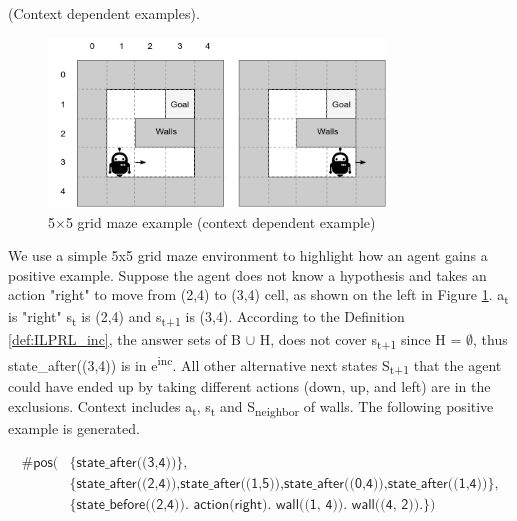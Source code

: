 
\begin{examp} \normalfont (Context dependent examples).

\begin{figure}[!htb]
\centering
\includegraphics[width=0.8\textwidth]{./figures/pipeline_example1}
\caption{5$\times$5 grid maze example (context dependent example)}
\label{example_pos_example}
\end{figure}

We use a simple 5x5 grid maze environment to highlight how an agent gains a positive example.
Suppose the agent does not know a hypothesis and takes an action "right" to move from (2,4) to (3,4) cell, as shown on the left in Figure \ref{example_pos_example}.
a\textsubscript{t} is "right" s\textsubscript{t} is (2,4) and s\textsubscript{t+1} is (3,4).
According to the Definition \ref{def:ILPRL_inc}, the answer sets of B $\cup$ H, does not cover s\textsubscript{t+1} since H = $\emptyset$, thus \textsf{state\_after((3,4))} is in e\textsuperscript{inc}.
All other alternative next states S\textsubscript{t+1} that the agent could have ended up by taking different actions
(down, up, and left) are in the exclusions.
Context includes a\textsubscript{t}, s\textsubscript{t} and S\textsubscript{neighbor} of walls.
The following positive example is generated.

\begin{equation}
\begin{split}
    \textsf{\#pos(} & \textsf{\{state\_after((3,4))\},}\\
                    & \textsf{\{state\_after((2,4)),state\_after((1,5)),state\_after((0,4)),state\_after((1,4))\},} \\
    & \textsf{\{state\_before((2,4)). action(right). wall((1, 4)). wall((4, 2)).\})}
\end{split}
\end{equation}


\end{examp}
